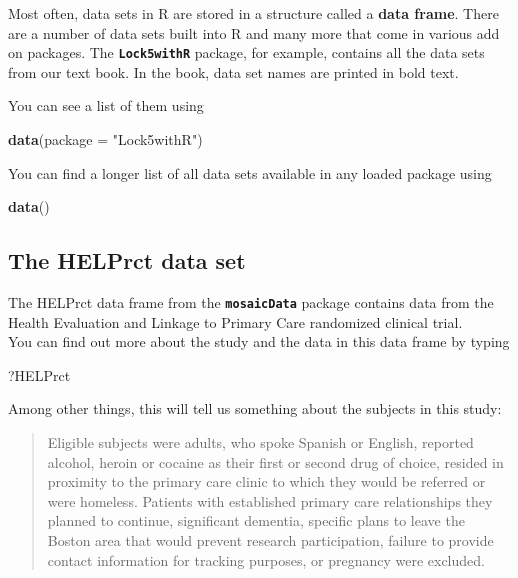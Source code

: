 \documentclass[]{book}
\newenvironment{Shaded}{\begin{snugshade}}{\end{snugshade}}
\newcommand{\DataTypeTok}[1]{\textcolor[rgb]{0.13,0.29,0.53}{#1}}
\newcommand{\KeywordTok}[1]{\textcolor[rgb]{0.13,0.29,0.53}{\textbf{#1}}}
\newcommand{\NormalTok}[1]{#1}
\newcommand{\StringTok}[1]{\textcolor[rgb]{0.31,0.60,0.02}{#1}}
\begin{document}
Most often, data sets in R are stored in a structure called a \textbf{data frame}. There are a number of data sets built into R and many more that come in various add on packages. The \textbf{\texttt{Lock5withR}} package, for example, contains all the data sets from our text book. In the book, data set names are printed in bold text.

You can see a list of them using

\begin{Shaded}
\begin{Highlighting}[]
\KeywordTok{data}\NormalTok{(}\DataTypeTok{package =} \StringTok{"Lock5withR"}\NormalTok{)}
\end{Highlighting}
\end{Shaded}

You can find a longer list of all data sets available in any loaded package using

\begin{Shaded}
\begin{Highlighting}[]
\KeywordTok{data}\NormalTok{()}
\end{Highlighting}
\end{Shaded}

\hypertarget{the-helprct-data-set}{%
\subsection{The HELPrct data set}\label{the-helprct-data-set}}

The {HELPrct} data frame from the \textbf{\texttt{mosaicData}} package contains data from the
Health Evaluation and Linkage to Primary Care randomized clinical trial.\\
You can find out more about the study and the data in this data frame by typing

\begin{Shaded}
\begin{Highlighting}[]
\NormalTok{?HELPrct}
\end{Highlighting}
\end{Shaded}

Among other things, this will tell us something about the subjects in this study:

\begin{quote}
Eligible subjects were adults, who spoke Spanish or English, reported
alcohol, heroin or cocaine as their first or second drug of choice, resided
in proximity to the primary care clinic to which they would be referred or
were homeless. Patients with established primary care relationships they
planned to continue, significant dementia, specific plans to leave the
Boston area that would prevent research participation, failure to provide
contact information for tracking purposes, or pregnancy were excluded.
\end{quote}
\end{document}

